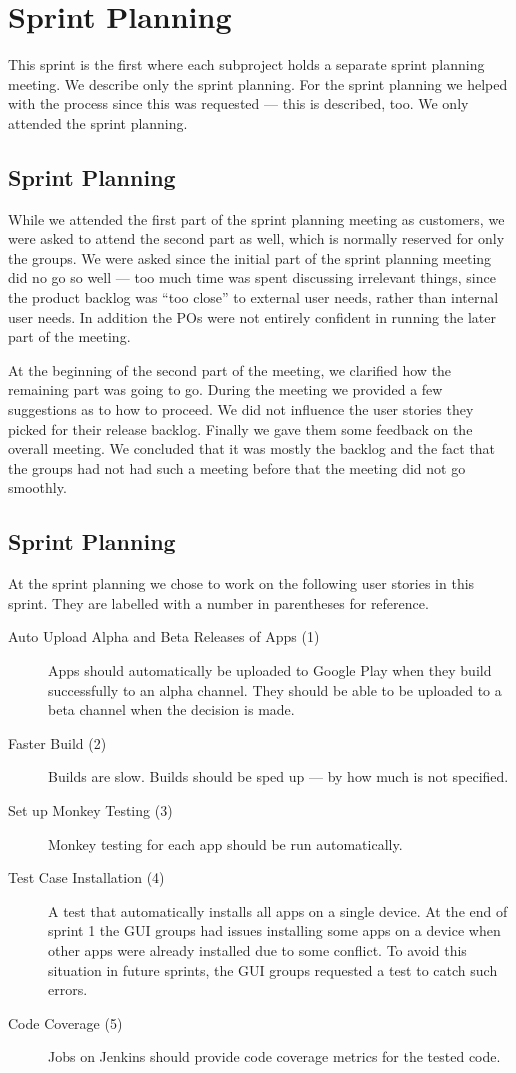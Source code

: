 \chapter{Sprint Planning}
This sprint is the first where each subproject holds a separate sprint planning meeting. We describe only the \bd sprint planning. For the \db sprint planning we helped with the process since this was requested --- this is described, too. We only attended the \gui sprint planning.

\section{\dbtitle Sprint Planning}
While we attended the first part of the \db sprint planning meeting as customers, we were asked to attend the second part as well, which is normally reserved for only the \db groups. We were asked since the initial part of the sprint planning meeting did no go so well --- too much time was spent discussing irrelevant things, since the product backlog was ``too close'' to external user needs, rather than internal user needs. In addition the \db POs were not entirely confident in running the later part of the meeting.

At the beginning of the second part of the meeting, we clarified how the remaining part was going to go. During the meeting we provided a few suggestions as to how to proceed. We did not influence the user stories they picked for their release backlog. Finally we gave them some feedback on the overall meeting. We concluded that it was mostly the backlog and the fact that the \db groups had not had such a meeting before that the meeting did not go smoothly.

\section{\bdtitle Sprint Planning}
At the \bd sprint planning we chose to work on the following user stories in this sprint. They are labelled with a number in parentheses for reference.

\begin{description}
  \item[Auto Upload Alpha and Beta Releases of Apps (1)] Apps should automatically be uploaded to Google Play when they build successfully to an alpha channel. They should be able to be uploaded to a beta channel when the decision is made.
  \item[Faster Build (2)] Builds are slow. Builds should be sped up --- by how much is not specified.
  \item[Set up Monkey Testing (3)] Monkey testing for each app should be run automatically.
  \item[Test Case Installation (4)] A test that automatically installs all apps on a single device. At the end of sprint 1 the GUI groups had issues installing some apps on a device when other apps were already installed due to some conflict. To avoid this situation in future sprints, the GUI groups requested a test to catch such errors.
  \item[Code Coverage (5)] Jobs on Jenkins should provide code coverage metrics for the tested code.
\end{description}

